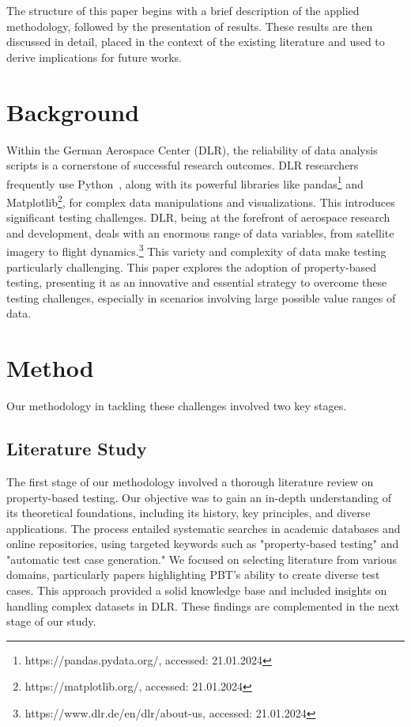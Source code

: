 \documentclass[runningheads]{llncs}
\begin{document}
The structure of this paper begins with a brief description of the applied methodology, followed by the presentation of results. These results are then discussed in detail, placed in the context of the existing literature and used to derive implications for future works.

\section{Background}
Within the German Aerospace Center (DLR), the reliability of data analysis scripts is a cornerstone of successful research outcomes. DLR researchers frequently use Python~\cite{Kurnatowski2020}, along with its powerful libraries like pandas\footnote{https://pandas.pydata.org/, accessed: 21.01.2024} and Matplotlib\footnote{https://matplotlib.org/, accessed: 21.01.2024}, for complex data manipulations and visualizations. This introduces significant testing challenges. DLR, being at the forefront of aerospace research and development, deals with an enormous range of data variables, from satellite imagery to flight dynamics.\footnote{https://www.dlr.de/en/dlr/about-us, accessed: 21.01.2024} This variety and complexity of data make testing particularly challenging. This paper explores the adoption of property-based testing, presenting it as an innovative and essential strategy to overcome these testing challenges, especially in scenarios involving large possible value ranges of data.

\section{Method}
Our methodology in tackling these challenges involved two key stages.

\subsection{Literature Study}
The first stage of our methodology involved a thorough literature review on property-based testing. Our objective was to gain an in-depth understanding of its theoretical foundations, including its history, key principles, and diverse applications. The process entailed systematic searches in academic databases and online repositories, using targeted keywords such as "property-based testing" and "automatic test case generation." We focused on selecting literature from various domains, particularly papers highlighting PBT's ability to create diverse test cases. This approach provided a solid knowledge base and included insights on handling complex datasets in DLR. These findings are complemented in the next stage of our study.
\end{document}
